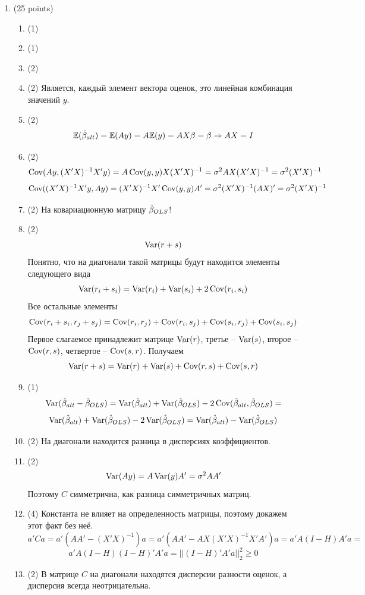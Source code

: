 \documentclass[12pt, a4paper]{article}\usepackage[]{graphicx}\usepackage[]{color}
\begin{document}
\begin{enumerate}

\item (25 points)
\begin{enumerate}
  \item (1)
  \item (1)
  \item (2)
  \item (2) Является, каждый элемент вектора оценок, это линейная комбинация значений $y$.
  \item (2)
\[
\mathbb{E} (\hat{\beta}_{alt}) = \mathbb{E} (Ay) = A\mathbb{E}(y) = AX\beta = \beta \Rightarrow AX = I
\]
  \item (2)
\[
\operatorname{Cov} (Ay, (X'X)^{-1}X'y) = A  \operatorname{Cov}(y, y) X (X'X)^{-1} = \sigma^2 AX(X'X)^{-1} = \sigma^2 (X'X)^{-1}
\]
\[
\operatorname{Cov} ((X'X)^{-1}X'y, Ay) = (X'X)^{-1}X' \operatorname{Cov}(y, y) A' = \sigma^2 (X'X)^{-1} (AX)' = \sigma^2 (X'X)^{-1}
\]
  \item (2)
На ковариационную матрицу $\hat{\beta}_{OLS}$!
  \item (2)
\[
\operatorname{Var} (r + s)
\]
Понятно, что на диагонали такой матрицы будут находится элементы следующего вида
\[
\operatorname{Var}(r_i + s_i) = \operatorname{Var} (r_i) + \operatorname{Var} (s_i) + 2\operatorname{Cov} (r_i, s_i)
\]
Все остальные элементы
\[
\operatorname{Cov}(r_i + s_i, r_j + s_j) = \operatorname{Cov}(r_i, r_j) + \operatorname{Cov}(r_i, s_j) +  \operatorname{Cov}(s_i, r_j) +  \operatorname{Cov}(s_i, s_j)
\]
Первое слагаемое принадлежит матрице $\operatorname{Var} (r)$, третье -- $\operatorname{Var}(s)$, второе -- $\operatorname{Cov}(r,s)$, четвертое -- $\operatorname{Cov}(s,r)$. Получаем
\[
\operatorname{Var}(r + s) = \operatorname{Var}(r) + \operatorname{Var} (s) + \operatorname{Cov}(r,s) + \operatorname{Cov}(s,r)
\]
  \item (1)
\[
\operatorname{Var} (\hat{\beta}_{alt} - \hat{\beta}_{OLS}) = \operatorname{Var}(\hat{\beta}_{alt}) + \operatorname{Var}(\hat{\beta}_{OLS}) - 2\operatorname{Cov} (\hat{\beta}_{alt}, \hat{\beta}_{OLS}) =
\]
\[
\operatorname{Var}(\hat{\beta}_{alt}) + \operatorname{Var}(\hat{\beta}_{OLS}) - 2\operatorname{Var}(\hat{\beta}_{OLS}) = \operatorname{Var}(\hat{\beta}_{alt}) - \operatorname{Var}(\hat{\beta}_{OLS})
\]
  \item (2)
На диагонали находится разница в дисперсиях коэффициентов.
  \item (2)
\[
\operatorname{Var} (Ay) = A \operatorname{Var}(y) A' = \sigma^2 AA'
\]
Поэтому $C$ симметрична,  как разница симметричных матриц.

  \item (4)
Константа не влияет на определенность матрицы, поэтому докажем этот факт без неё.
\[
a'Ca = a'(AA' - (X'X)^{-1})a = a'(AA' - AX(X'X)^{-1}X'A')a = a'A(I - H)A'a =
\]
\[
 a'A(I - H)(I - H)'A'a = ||(I - H)'A'a||^2_2 \geq 0
\]
  \item (2)
В матрице $C$ на диагонали находятся дисперсии разности оценок, а дисперсия всегда неотрицательна.
\end{enumerate}


\end{enumerate}
\end{document}
